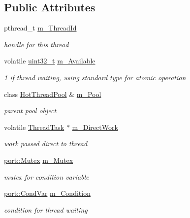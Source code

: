 \subsection*{Public Attributes}
\begin{DoxyCompactItemize}
\item 
pthread\+\_\+t \hyperlink{structleveldb_1_1_hot_thread_a9c05159cb466d0681f8c068fd92b4cb3}{m\+\_\+\+Thread\+Id}
\begin{DoxyCompactList}\small\item\em handle for this thread \end{DoxyCompactList}\item 
volatile \hyperlink{stdint_8h_a435d1572bf3f880d55459d9805097f62}{uint32\+\_\+t} \hyperlink{structleveldb_1_1_hot_thread_af6a8ce25afa9a8a54ddc453a456cd08e}{m\+\_\+\+Available}
\begin{DoxyCompactList}\small\item\em 1 if thread waiting, using standard type for atomic operation \end{DoxyCompactList}\item 
class \hyperlink{classleveldb_1_1_hot_thread_pool}{Hot\+Thread\+Pool} \& \hyperlink{structleveldb_1_1_hot_thread_ab42a98dcba66173c32c6b47ec3cabb4e}{m\+\_\+\+Pool}
\begin{DoxyCompactList}\small\item\em parent pool object \end{DoxyCompactList}\item 
volatile \hyperlink{classleveldb_1_1_thread_task}{Thread\+Task} $\ast$ \hyperlink{structleveldb_1_1_hot_thread_a18e771cb85ee461a0a790ee5a405f1e7}{m\+\_\+\+Direct\+Work}
\begin{DoxyCompactList}\small\item\em work passed direct to thread \end{DoxyCompactList}\item 
\hyperlink{classleveldb_1_1port_1_1_mutex}{port\+::\+Mutex} \hyperlink{structleveldb_1_1_hot_thread_a26f6be5d8a8b888eef2ebae5a382c854}{m\+\_\+\+Mutex}
\begin{DoxyCompactList}\small\item\em mutex for condition variable \end{DoxyCompactList}\item 
\hyperlink{classleveldb_1_1port_1_1_cond_var}{port\+::\+Cond\+Var} \hyperlink{structleveldb_1_1_hot_thread_a125803d2ca640557d1c7a62eb666fb70}{m\+\_\+\+Condition}
\begin{DoxyCompactList}\small\item\em condition for thread waiting \end{DoxyCompactList}\end{DoxyCompactItemize}
